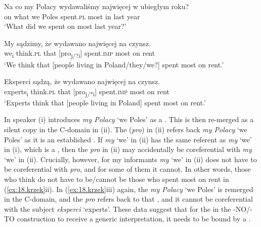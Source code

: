 \documentclass[output=paper]{LSP/langsci}
\begin{document}
\ea%
\label{ex:18.krzek}
\begin{xlist}[(iii)]
\gll Na co   my Polacy  wydawaliśmy   najwięcej   w ubiegłym   roku? \\
            on what  we Poles  spent.\textsc{pl}        most     in last     year\\
\glt ‘What did we spent on most last year?’

\gll My sądzimy,   że       wydawano najwięcej   na czynsz. \\
             we\textsubscript{i}   think.\textsc{pl}    {that   [pro\textsubscript{j/?i}]}  spent.\textsc{imp}   most     on rent   \\

\glt ‘We think that [people living in Poland/they/we?] spent most on rent.’

\gll Eksperci    sądzą,     że       wydawano najwięcej   na czynsz. \\
             experts\textsubscript{i}    think.\textsc{pl}    {that  [pro\textsubscript{j/*i}]}  spent.\textsc{imp}   most     on rent   \\
\glt ‘Experts think that [people living in Poland] spent most on rent.’
\end{xlist}
\z

In  speaker (i) introduces \textit{my Polacy} ‘we Poles’ as a . This  is then re-merged as a silent copy in the C-domain in (ii).  The  (\textit{pro}) in (ii) refers back \textit{my Polacy} ‘we Poles’ as it is an established . If \textit{my} ‘we’ in (ii) has the same referent as \textit{my} ‘we’ in (i), which is a , then the \textit{pro} in (ii) may accidentally be  coreferential with \textit{my} ‘we’ in (ii). Crucially, however, for my informants \textit{my} ‘we’ in (ii) does not have to be coreferential with \textit{pro}, and for some of them it cannot. In other words, those who think do not have to be/cannot be those who spent most on rent in (\ref{ex:18.krzek}ii). In (\ref{ex:18.krzek}iii) again, the  \textit{my Polacy} ‘we Poles’ is remerged in the C-domain, and the  \textit{pro} refers back to that , and it cannot be coreferential with the subject \textit{eksperci} ‘experts’. These data suggest that for the  in the -NO/-TO construction to receive a generic interpretation, it needs to be bound by a .
\end{document}

